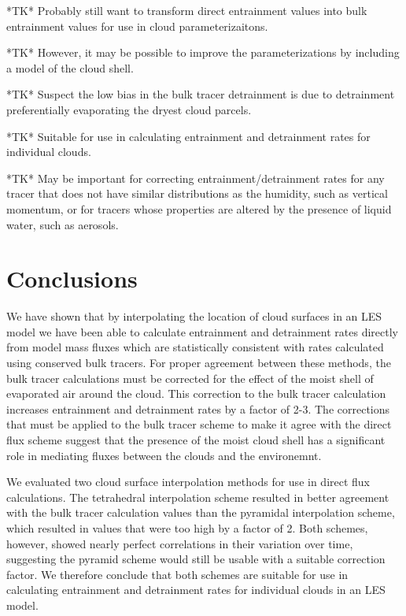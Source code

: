 \documentclass[12pt]{article}
\begin{document}
*TK* Probably still want to transform direct entrainment values into bulk 
entrainment values for use in cloud parameterizaitons.

*TK* However, it may be possible to improve the parameterizations by including 
a model of the cloud shell.

*TK* Suspect the low bias in the bulk tracer detrainment is due to detrainment
preferentially evaporating the dryest cloud parcels.

*TK* Suitable for use in calculating entrainment and detrainment rates for 
individual clouds.

*TK* May be important for correcting entrainment/detrainment rates for any 
tracer that does not have similar distributions as the humidity, such as 
vertical momentum, or for tracers whose properties are altered by the presence 
of liquid water, such as aerosols.



\section{Conclusions}

We have shown that by interpolating the location of cloud surfaces in an LES
model we have been able to calculate entrainment and detrainment rates directly 
from model mass fluxes which are statistically consistent with rates calculated
using conserved bulk tracers.  For proper agreement between these methods, the
bulk tracer calculations must be corrected for the effect of the moist shell of
evaporated air around the cloud.  This correction to the bulk tracer calculation
increases entrainment and detrainment rates by a factor of 2-3.  The 
corrections that must be applied to the bulk tracer scheme to make it agree
with the direct flux scheme suggest that the presence of the moist cloud shell 
has a significant role in mediating fluxes between the clouds and the
environemnt.  

We evaluated two cloud surface interpolation methods for use in direct flux 
calculations.  The tetrahedral interpolation scheme resulted in better
agreement with the bulk tracer calculation values than the pyramidal
interpolation scheme, which resulted in values that were too high by a factor
 of 2.  Both schemes, however, showed nearly perfect correlations in their
variation over time, suggesting the pyramid scheme would still be usable with a
suitable correction factor.  We therefore conclude that both schemes are
suitable for use in calculating entrainment and detrainment rates for
individual clouds in an LES model.
\end{document}
